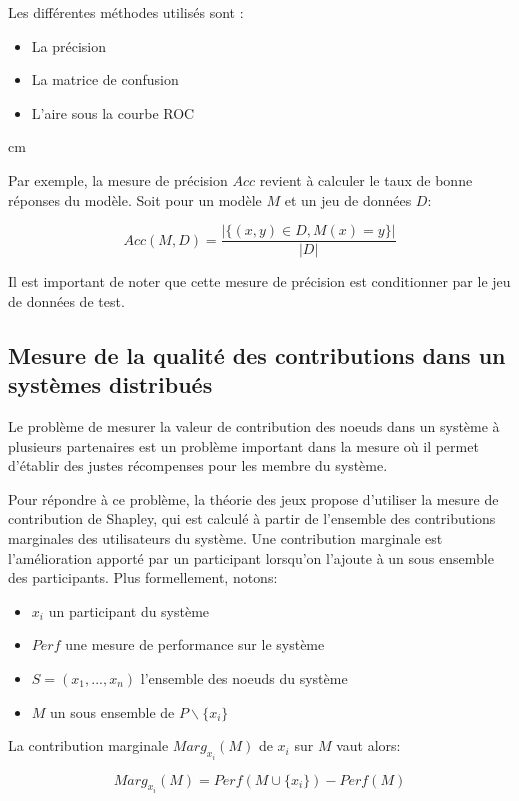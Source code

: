 \documentclass[stage3a]{tnreport} %
\begin{document}
Les différentes méthodes utilisés sont :
\begin{itemize}
  \item La précision 
  \item La matrice de confusion 
  \item L'aire sous la courbe ROC 
\end{itemize}

 cm

Par exemple, la mesure de précision $Acc$ revient à calculer le taux de bonne réponses du modèle. Soit pour un modèle $M$ et un jeu de données $D$:

\begin{equation}
  Acc(M,D)= \frac{|\{ (x,y)\in D , M(x) = y \}|}{|D|}
\end{equation}

Il est important de noter que cette mesure de précision est conditionner par le jeu de données de test.

\subsection{Mesure de la qualité des contributions dans un systèmes distribués} \label{Shapley}

Le problème de mesurer la valeur de contribution des noeuds dans un système à plusieurs partenaires est un problème important dans la mesure où il permet d'établir des justes récompenses pour les membre du système.

Pour répondre à ce problème, la théorie des jeux propose d'utiliser la mesure de contribution de Shapley, qui est calculé à partir de l'ensemble des contributions marginales des utilisateurs du système. Une contribution marginale est l'amélioration apporté par un participant lorsqu'on l'ajoute à un sous ensemble des participants. Plus formellement, notons:

\begin{itemize}
  \item $x_i$ un participant du système 
  \item $Perf$ une mesure de performance sur le système
  \item $S = (x_1,...,x_n)$ l'ensemble des noeuds du système
  \item $M$ un sous ensemble de $P \backslash \{x_i\}$
\end{itemize}

La contribution marginale $Marg_{x_i}(M)$ de $x_i$ sur $M$ vaut alors:

\begin{equation}
  Marg_{x_i}(M) = Perf(M \cup \{x_i\}) - Perf(M)
\end{equation}
\end{document}
